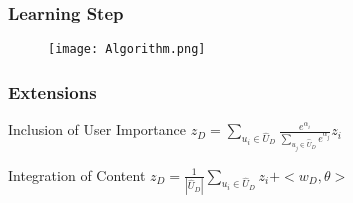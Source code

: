 \begin{frame}
	\frametitle{Learning Step}
	\begin{figure}
		\centering
		\texttt{[image: Algorithm.png]}
	\end{figure}
\end{frame}

\begin{frame}
	\frametitle{Extensions}
	\begin{block}{Inclusion of User Importance}
		\centering
		$z_D = \sum_{\textit{u}_i \in \hat{\textit{U}}_D}
		\frac{\textit{e}^{\alpha_i}}{
			\sum_{\textit{u}_j \in \hat{\textit{U}}_D} \textit{e}^{\alpha_j}
		} \textit{z}_i$
	\end{block}
	\begin{block}{Integration of Content}
		\centering
		$
		z_D = \frac{1}{|\hat{\textit{U}}_D|}
		\sum_{\textit{u}_i \in \hat{\textit{U}}_D} \textit{z}_i + <\textit{w}_D, \theta>
		$
	\end{block}
\end{frame}